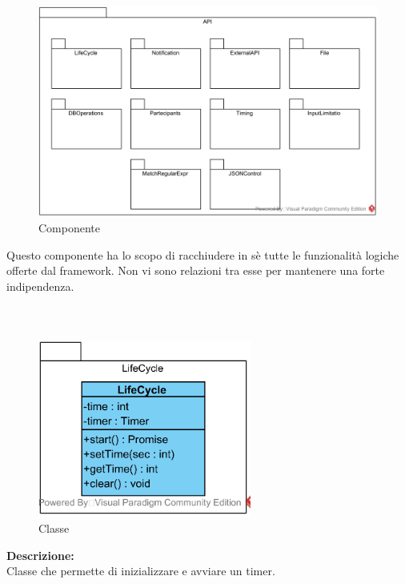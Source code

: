 \paragraph[::API]{\class}\mbox{}\\ \label{\class}
\begin{figure}[H]
	\centering
	\includegraphics[width=15cm]{./diagrammi/framework/model/api.png}
	\caption{Componente \class}
\end{figure}
Questo componente ha lo scopo di racchiudere in sè tutte le funzionalità logiche offerte dal framework. Non vi sono relazioni tra esse per mantenere una forte indipendenza.

\subparagraph[::LifeCycle::LifeCycle]{\class}\mbox{}\\ \label{\class}
\begin{figure}[H]
	\centering
	\includegraphics[width=7cm]{./diagrammi/framework/model/api/lifecycle.png}
	\caption{Classe \class}
\end{figure}

\textbf{Descrizione:}\\
Classe che permette di inizializzare e avviare un timer.

